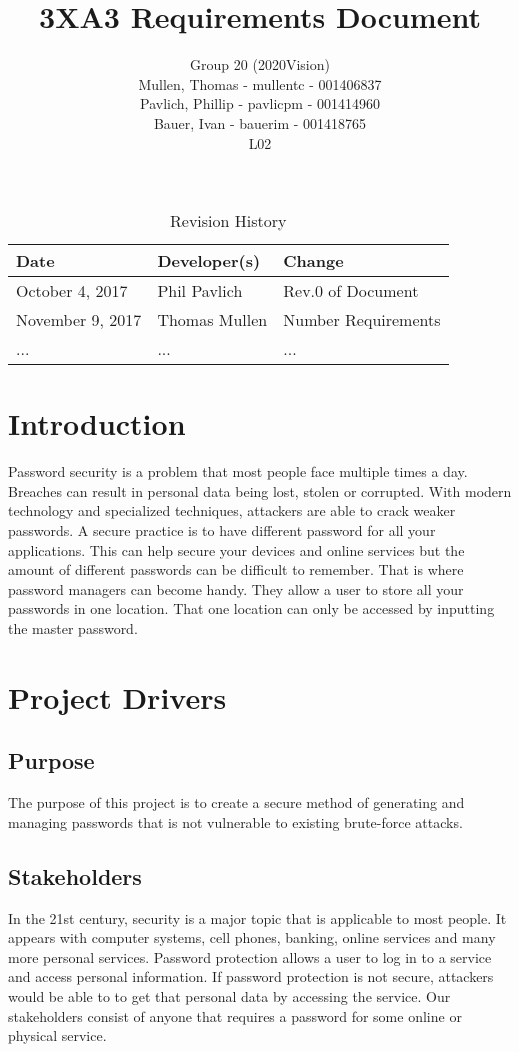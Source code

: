 \documentclass[12pt]{article}
\title{3XA3 Requirements Document}
\author{Group 20 (2020Vision)\\
Mullen, Thomas - mullentc - 001406837\\
Pavlich, Phillip - pavlicpm - 001414960\\
Bauer, Ivan - bauerim - 001418765\\
L02}
\date{}
\begin{document}
\begin{table}[hp]
\caption{Revision History} \label{TblRevisionHistory}
\begin{tabularx}{\textwidth}{XXl}
\toprule
\textbf{Date} & \textbf{Developer(s)} & \textbf{Change}\\
\midrule
October 4, 2017 & Phil Pavlich & Rev.0 of Document\\
November 9, 2017 & Thomas Mullen & Number Requirements\\
... & ... & ...\\
\bottomrule
\end{tabularx}
\end{table}
\newpage

\maketitle
\newpage

\section{Introduction}
Password security is a problem that most people face multiple times a day. Breaches can result in personal data being lost, stolen or corrupted. With modern technology and specialized techniques, attackers are able to crack weaker passwords. A secure practice is to have different password for all your applications. This can help secure your devices and online services but the amount of different passwords can be difficult to remember. That is where password managers can become handy. They allow a user to store all your passwords in one location. That one location can only be accessed by inputting the master password.

\section{Project Drivers}
\subsection{Purpose}
The purpose of this project is to create a secure method of generating and managing passwords that is not vulnerable to existing brute-force attacks.

\subsection{Stakeholders}
In the 21st century, security is a major topic that is applicable to most people. It appears with computer systems, cell phones, banking, online services and many more personal services. Password protection allows a user to log in to a service and access personal information. If password protection is not secure, attackers would be able to to get that personal data by accessing the service. Our stakeholders consist of anyone that requires a password for some online or physical service.
\end{document}
